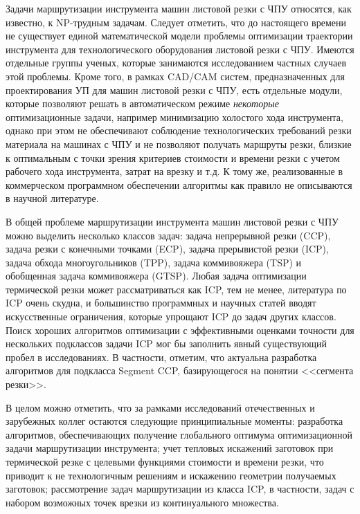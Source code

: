 Задачи маршрутизации инструмента машин листовой резки с ЧПУ относятся,
как известно,
к
NP-трудным задачам.
Следует отметить,
что до настоящего времени не существует единой математической модели
проблемы оптимизации траектории инструмента для технологического оборудования листовой резки с ЧПУ.
Имеются отдельные группы ученых, которые занимаются исследованием частных случаев этой проблемы.
Кроме того, в рамках CAD/CAM систем,
предназначенных для проектирования УП для машин листовой резки с ЧПУ,
есть отдельные модули, которые позволяют решать
в автоматическом режиме
\textit{некоторые} оптимизационные задачи,
например минимизацию холостого хода инструмента,
однако при этом не обеспечивают соблюдение технологических требований резки материала на машинах с ЧПУ
и не позволяют получать маршруты резки,
близкие к оптимальным с точки зрения критериев стоимости и времени резки с учетом рабочего хода инструмента,
затрат на врезку и т.д.
К тому же, реализованные в коммерческом программном обеспечении алгоритмы
как правило не описываются в научной литературе.

В общей проблеме маршрутизации инструмента машин листовой резки с ЧПУ
можно выделить несколько классов задач:
задача непрерывной резки (CCP),
задача резки с конечными точками (ECP),
задача прерывистой резки (ICP),
задача обхода многоугольников (TPP),
задача коммивояжера (TSP)
и обобщенная задача коммивояжера (GTSP).
Любая задача оптимизации термической резки может рассматриваться как ICP,
тем не менее, литература по ICP очень скудна,
и большинство программных и научных статей вводят искусственные ограничения,
которые упрощают ICP до задач других классов.
Поиск хороших алгоритмов оптимизации
с эффективными оценками точности для нескольких подклассов задачи
ICP
мог бы заполнить явный существующий пробел в исследованиях.
В частности, отметим,
что актуальна разработка алгоритмов для подкласса Segment CCP,
базирующегося на понятии <<сегмента резки>>.

В целом можно отметить,
что за рамками исследований отечественных и зарубежных коллег остаются следующие принципиальные моменты:
  разработка алгоритмов, обеспечивающих получение глобального оптимума
  оптимизационной задачи маршрутизации инструмента;
  учет тепловых искажений заготовок при термической резке
  с целевыми функциями стоимости и времени резки,
  что приводит к не технологичным решениям
  и искажению геометрии получаемых заготовок;
  рассмотрение задач маршрутизации из класса ICP,
  в частности,
  задач с набором возможных точек врезки из континуального множества.

